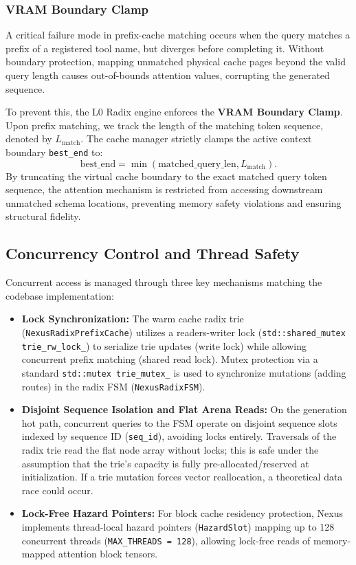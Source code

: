 \subsubsection{VRAM Boundary Clamp}
A critical failure mode in prefix-cache matching occurs when the query matches a prefix of a registered tool name, but diverges before completing it. Without boundary protection, mapping unmatched physical cache pages beyond the valid query length causes out-of-bounds attention values, corrupting the generated sequence.

To prevent this, the L0 Radix engine enforces the \textbf{VRAM Boundary Clamp}. Upon prefix matching, we track the length of the matching token sequence, denoted by $L_{\text{match}}$. The cache manager strictly clamps the active context boundary \texttt{best\_end} to:
\begin{equation}
\text{best\_end} = \min\left( \text{matched\_query\_len}, L_{\text{match}} \right).
\end{equation}
By truncating the virtual cache boundary to the exact matched query token sequence, the attention mechanism is restricted from accessing downstream unmatched schema locations, preventing memory safety violations and ensuring structural fidelity.

\subsection{Concurrency Control and Thread Safety}
Concurrent access is managed through three key mechanisms matching the codebase implementation:

\begin{itemize}
  \item \textbf{Lock Synchronization:} The warm cache radix trie (\texttt{NexusRadixPrefixCache}) utilizes a readers-writer lock (\texttt{std::shared\_mutex trie\_rw\_lock\_}) to serialize trie updates (write lock) while allowing concurrent prefix matching (shared read lock). Mutex protection via a standard \texttt{std::mutex trie\_mutex\_} is used to synchronize mutations (adding routes) in the radix FSM (\texttt{NexusRadixFSM}).
  \item \textbf{Disjoint Sequence Isolation and Flat Arena Reads:} On the generation hot path, concurrent queries to the FSM operate on disjoint sequence slots indexed by sequence ID (\texttt{seq\_id}), avoiding locks entirely. Traversals of the radix trie read the flat node array without locks; this is safe under the assumption that the trie's capacity is fully pre-allocated/reserved at initialization. If a trie mutation forces vector reallocation, a theoretical data race could occur.
  \item \textbf{Lock-Free Hazard Pointers:} For block cache residency protection, Nexus implements thread-local hazard pointers (\texttt{HazardSlot}) mapping up to 128 concurrent threads (\texttt{MAX\_THREADS = 128}), allowing lock-free reads of memory-mapped attention block tensors.
\end{itemize}

